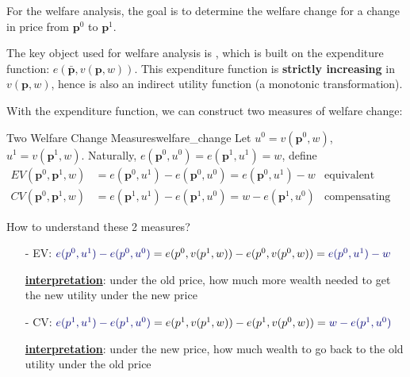 For the welfare analysis, the goal is to determine the welfare change for a change in price from $\mathbf{p}^0$ to $\mathbf{p}^1$.

The key object used for welfare analysis is , which is built on the expenditure function: $e(\bar{\mathbf{p}},v(\mathbf{p},w))$. This expenditure function is \textbf{strictly increasing} in $v(\mathbf{p},w)$, hence is also an indirect utility function (a monotonic transformation).

With the expenditure function, we can construct two measures of welfare change:
\begin{definition}{Two Welfare Change Measures}{welfare_change}
    Let $u^0 = v(\mathbf{p}^0,w)$, $u^1 = v(\mathbf{p}^1,w)$. Naturally, $e(\mathbf{p}^0,u^0)=e(\mathbf{p}^1,u^1)=w$, define
    \begin{align*}
        EV(\mathbf{p}^0,\mathbf{p}^1,w) &=e(\mathbf{p}^0,u^1)-e(\mathbf{p}^0,u^0)=e(\mathbf{p}^0,u^1)-w & \text{equivalent variation}\\
        CV(\mathbf{p}^0,\mathbf{p}^1,w) &=e(\mathbf{p}^1,u^1)-e(\mathbf{p}^1,u^0)=w-e(\mathbf{p}^1,u^0) & \text{compensating variation}
    \end{align*}
\end{definition}

How to understand these 2 measures?

\begin{itemize}
    \item[-] EV: ${\color{blue!45!black}e(p^0,u^1)-e(p^0,u^0)} = e(p^0,v(p^1,w))-e(p^0,v(p^0,w)) = {\color{blue!45!black}e(p^0,u^1)-w}$
    
    \underline{\textbf{interpretation}}: under the old price, how much more wealth needed to get the new utility under the new price
    
    \item[-] CV: ${\color{blue!45!black}e(p^1,u^1)-e(p^1,u^0)} = e(p^1,v(p^1,w))-e(p^1,v(p^0,w)) = {\color{blue!45!black}w- e(p^1,u^0)}$
    
    \underline{\textbf{interpretation}}: under the new price, how much wealth to go back to the old utility under the old price
\end{itemize}